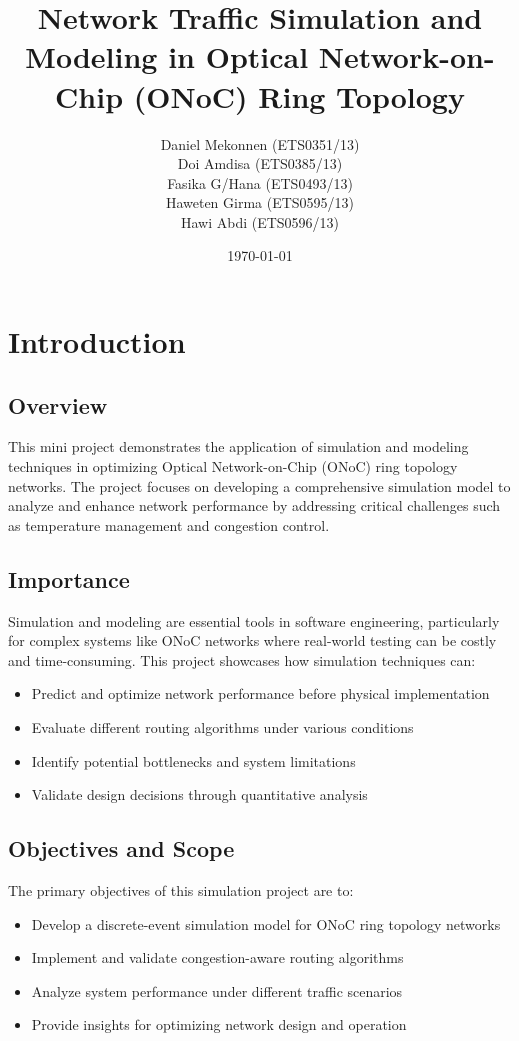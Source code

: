 \documentclass[12pt]{article}
\title{Network Traffic Simulation and Modeling in Optical Network-on-Chip (ONoC) Ring Topology}
\author{
    Daniel Mekonnen (ETS0351/13) \\
    Doi Amdisa (ETS0385/13) \\
    Fasika G/Hana (ETS0493/13) \\
    Haweten Girma (ETS0595/13) \\
    Hawi Abdi (ETS0596/13)
}
\date{\today}
\begin{document}
\maketitle

\tableofcontents

\section{Introduction}
\subsection{Overview}
This mini project demonstrates the application of simulation and modeling techniques in optimizing Optical Network-on-Chip (ONoC) ring topology networks. The project focuses on developing a comprehensive simulation model to analyze and enhance network performance by addressing critical challenges such as temperature management and congestion control.

\subsection{Importance}
Simulation and modeling are essential tools in software engineering, particularly for complex systems like ONoC networks where real-world testing can be costly and time-consuming. This project showcases how simulation techniques can:
\begin{itemize}
    \item Predict and optimize network performance before physical implementation
    \item Evaluate different routing algorithms under various conditions
    \item Identify potential bottlenecks and system limitations
    \item Validate design decisions through quantitative analysis
\end{itemize}

\subsection{Objectives and Scope}
The primary objectives of this simulation project are to:
\begin{itemize}
    \item Develop a discrete-event simulation model for ONoC ring topology networks
    \item Implement and validate congestion-aware routing algorithms
    \item Analyze system performance under different traffic scenarios
    \item Provide insights for optimizing network design and operation
\end{itemize}
\end{document}

